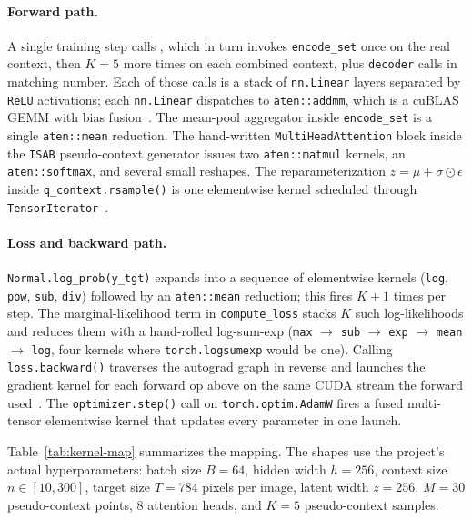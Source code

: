 \documentclass[11pt]{article}
\begin{document}
\paragraph{Forward path.} A single training step calls
, which in
turn invokes \texttt{encode\_set} once on the real context, then
$K{=}5$ more times on each combined context, plus \texttt{decoder}
calls in matching number. Each of those calls is a stack of
\texttt{nn.Linear} layers separated by \texttt{ReLU} activations; each
\texttt{nn.Linear} dispatches to \texttt{aten::addmm}, which is a
cuBLAS GEMM with bias fusion~\cite{cublas}. The mean-pool aggregator inside
\texttt{encode\_set} is a single \texttt{aten::mean} reduction. The
hand-written \texttt{MultiHeadAttention} block inside the
\texttt{ISAB} pseudo-context generator issues two
\texttt{aten::matmul} kernels, an \texttt{aten::softmax}, and several
small reshapes. The reparameterization
$z = \mu + \sigma \odot \epsilon$ inside \texttt{q\_context.rsample()}
is one elementwise kernel scheduled through \texttt{TensorIterator}~\cite{ezyang}.

\paragraph{Loss and backward path.} \texttt{Normal.log\_prob(y\_tgt)}
expands into a sequence of elementwise kernels (\texttt{log},
\texttt{pow}, \texttt{sub}, \texttt{div}) followed by an
\texttt{aten::mean} reduction; this fires $K{+}1$ times per step. The
marginal-likelihood term in \texttt{compute\_loss} stacks $K$ such
log-likelihoods and reduces them with a hand-rolled log-sum-exp
(\texttt{max} $\to$ \texttt{sub} $\to$ \texttt{exp} $\to$
\texttt{mean} $\to$ \texttt{log}, four kernels where
\texttt{torch.logsumexp} would be one). Calling
\texttt{loss.backward()} traverses the autograd graph in reverse and
launches the gradient kernel for each forward op above on the same
CUDA stream the forward used~\cite{cudasem}. The
\texttt{optimizer.step()} call on \texttt{torch.optim.AdamW} fires a
fused multi-tensor elementwise kernel that updates every parameter in
one launch.

Table~\ref{tab:kernel-map} summarizes the mapping. The shapes use the
project's actual hyperparameters: batch size $B{=}64$, hidden width
$h{=}256$, context size $n \in [10, 300]$, target size $T{=}784$
pixels per image, latent width $z{=}256$, $M{=}30$ pseudo-context
points, $8$ attention heads, and $K{=}5$ pseudo-context samples.
\end{document}
